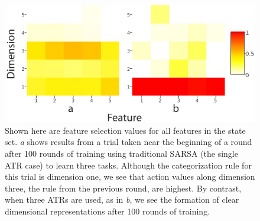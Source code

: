 \documentclass[10pt,letterpaper]{article}
\begin{document}
\begin{figure}[t!]
    \centering
    \includegraphics[scale=.65]{images/actionvals_hm.pdf}
    \caption[]{Shown here are feature selection values for all features in the state set. \textit{a} shows results from a trial taken near the beginning of a round after 100 rounds of training using traditional SARSA (the single ATR case) to learn three tasks. Although the categorization rule for this trial is dimension one, we see that action values along dimension three, the rule from the previous round, are highest. By contrast, when three ATRs are used, as in \textit{b}, we see the formation of clear dimensional representations after 100 rounds of training.}
    \label{fig:actionvals_hm}
\end{figure}
\end{document}
